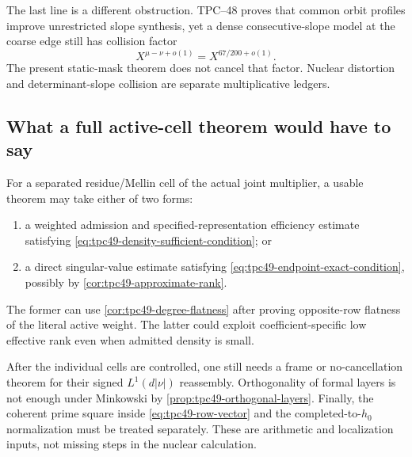 The last line is a different obstruction.  TPC--48 proves that common
orbit profiles improve unrestricted slope synthesis, yet a dense
consecutive-slope model at the coarse edge still has collision factor
\begin{equation}
 X^{\mu-\nu+o(1)}=X^{67/200+o(1)}.
 \label{eq:tpc49-inherited-collision}
\end{equation}
The present static-mask theorem does not cancel that factor.  Nuclear
distortion and determinant-slope collision are separate multiplicative
ledgers.

\subsection{What a full active-cell theorem would have to say}

For a separated residue/Mellin cell of the actual joint multiplier, a
usable theorem may take either of two forms:
\begin{enumerate}[label=\textup{(\alph*)},leftmargin=2.4em]
 \item a weighted admission and specified-representation efficiency estimate satisfying
       \eqref{eq:tpc49-density-sufficient-condition}; or
 \item a direct singular-value estimate satisfying
       \eqref{eq:tpc49-endpoint-exact-condition}, possibly by
       \cref{cor:tpc49-approximate-rank}.
\end{enumerate}
The former can use \cref{cor:tpc49-degree-flatness} after proving
opposite-row flatness of the literal active weight.  The latter could
exploit coefficient-specific low effective rank even when admitted
density is small.

After the individual cells are controlled, one still needs a frame or
no-cancellation theorem for their signed \(L^1(d|\nu|)\) reassembly.
Orthogonality of formal layers is not enough under Minkowski by
\cref{prop:tpc49-orthogonal-layers}.  Finally, the coherent prime square
inside \eqref{eq:tpc49-row-vector} and the completed-to-\(h_0\)
normalization must be treated separately.  These are arithmetic and
localization inputs, not missing steps in the nuclear calculation.
